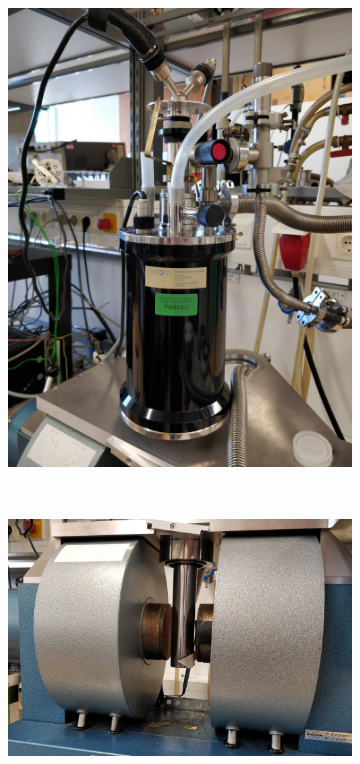 \documentclass[11pt,a4paper]{article}
\begin{document}
\begin{figure}[H]
\begin{subfigure}[b]{0.45\textwidth}
\includegraphics[width=\textwidth]{cryostat}
\caption{}
\label{fig:cryostat}
\end{subfigure}\\\vspace{.2cm}
\begin{subfigure}[b]{0.6\textwidth}
\includegraphics[width=\textwidth]{electromagnet}

\end{subfigure}
\end{figure}
\end{document}
